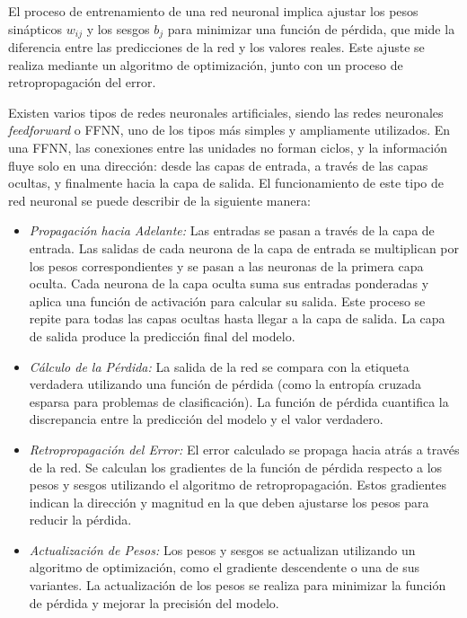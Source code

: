 \documentclass[conference]{IEEEtran}
\begin{document}
El proceso de entrenamiento de una red neuronal implica ajustar los pesos sinápticos $w_{ij}$ y los sesgos $b_{j}$ para minimizar una función de pérdida, que mide la diferencia entre las predicciones de la red y los valores reales. Este ajuste se realiza mediante un algoritmo de optimización, junto con un proceso de retropropagación del error.

Existen varios tipos de redes neuronales artificiales, siendo las redes neuronales \textit{feedforward} o FFNN, uno de los tipos más simples y ampliamente utilizados. \cite{mem12} En una FFNN, las conexiones entre las unidades no forman ciclos, y la información fluye solo en una dirección: desde las capas de entrada, a través de las capas ocultas, y finalmente hacia la capa de salida. El funcionamiento de este tipo de red neuronal se puede describir de la siguiente manera:

\begin{itemize}
	\item \textit{Propagación hacia Adelante:} Las entradas se pasan a través de la capa de entrada. Las salidas de cada neurona de la capa de entrada se multiplican por los pesos correspondientes y se pasan a las neuronas de la primera capa oculta. Cada neurona de la capa oculta suma sus entradas ponderadas y aplica una función de activación para calcular su salida.	Este proceso se repite para todas las capas ocultas hasta llegar a la capa de salida.	La capa de salida produce la predicción final del modelo.
	\item \textit{Cálculo de la Pérdida:} La salida de la red se compara con la etiqueta verdadera utilizando una función de pérdida (como la entropía cruzada esparsa para problemas de clasificación). La función de pérdida cuantifica la discrepancia entre la predicción del modelo y el valor verdadero.
	\item \textit{Retropropagación del Error:} El error calculado se propaga hacia atrás a través de la red. Se calculan los gradientes de la función de pérdida respecto a los pesos y sesgos utilizando el algoritmo de retropropagación. Estos gradientes indican la dirección y magnitud en la que deben ajustarse los pesos para reducir la pérdida. 
	\item \textit{Actualización de Pesos:} Los pesos y sesgos se actualizan utilizando un algoritmo de optimización, como el gradiente descendente o una de sus variantes. La actualización de los pesos se realiza para minimizar la función de pérdida y mejorar la precisión del modelo.
\end{itemize}
\end{document}
